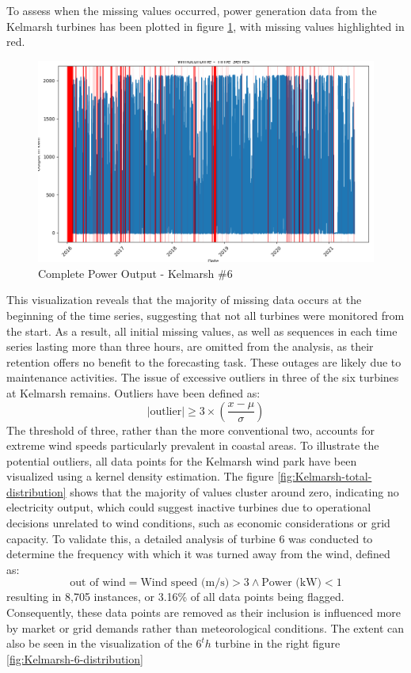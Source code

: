 \documentclass{article}
\begin{document}
To assess when the missing values occurred, power generation data from the Kelmarsh turbines has been plotted in figure \ref{fig:Kelmarsh-missing-values}, with missing values highlighted in red. 

\begin{figure}
    \centering
    \includegraphics[width=\linewidth]{graphs/data/Windturbine - Time Series.png}
    \caption{Complete Power Output - Kelmarsh \#6}
    \label{fig:Kelmarsh-missing-values}
\end{figure}

This visualization reveals that the majority of missing data occurs at the beginning of the time series, suggesting that not all turbines were monitored from the start. As a result, all initial missing values, as well as sequences in each time series lasting more than three hours, are omitted from the analysis, as their retention offers no benefit to the forecasting task. These outages are likely due to maintenance activities. The issue of excessive outliers in three of the six turbines at Kelmarsh remains. Outliers have been defined as:
\begin{equation}
    |\text{outlier}| \geq 3 \times \left( \frac{x - \mu}{\sigma} \right)
\end{equation}
The threshold of three, rather than the more conventional two, accounts for extreme wind speeds particularly prevalent in coastal areas. To illustrate the potential outliers, all data points for the Kelmarsh wind park have been visualized using a kernel density estimation. The figure \ref{fig:Kelmarsh-total-distribution} shows that the majority of values cluster around zero, indicating no electricity output, which could suggest inactive turbines due to operational decisions unrelated to wind conditions, such as economic considerations or grid capacity. To validate this, a detailed analysis of turbine 6 was conducted to determine the frequency with which it was turned away from the wind, defined as:
\begin{equation}
    \text{out of wind} = \text{Wind speed (m/s)} > 3 \land \text{Power (kW)} < 1 
\end{equation}
resulting in 8,705 instances, or 3.16\% of all data points being flagged. Consequently, these data points are removed as their inclusion is influenced more by market or grid demands rather than meteorological conditions. The extent can also be seen in the visualization of the $6^th$ turbine in the right figure \ref{fig:Kelmarsh-6-distribution}
\end{document}
